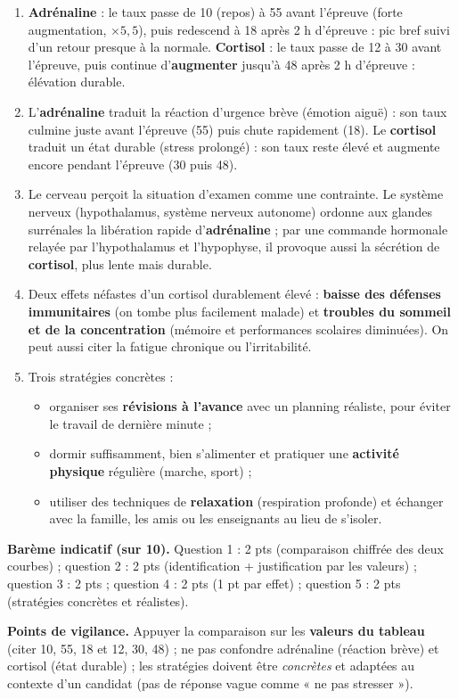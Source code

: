 \documentclass[11pt]{article}
\begin{document}
\begin{corrige}
\begin{enumerate}
\item \textbf{Adrénaline} : le taux passe de 10 (repos) à 55 avant l'épreuve (forte augmentation, $\times 5,5$), puis redescend à 18 après 2 h d'épreuve : pic bref suivi d'un retour presque à la normale. \textbf{Cortisol} : le taux passe de 12 à 30 avant l'épreuve, puis continue d'\textbf{augmenter} jusqu'à 48 après 2 h d'épreuve : élévation durable.
\item L'\textbf{adrénaline} traduit la réaction d'urgence brève (émotion aiguë) : son taux culmine juste avant l'épreuve (55) puis chute rapidement (18). Le \textbf{cortisol} traduit un état durable (stress prolongé) : son taux reste élevé et augmente encore pendant l'épreuve (30 puis 48).
\item Le cerveau perçoit la situation d'examen comme une contrainte. Le système nerveux (hypothalamus, système nerveux autonome) ordonne aux glandes surrénales la libération rapide d'\textbf{adrénaline} ; par une commande hormonale relayée par l'hypothalamus et l'hypophyse, il provoque aussi la sécrétion de \textbf{cortisol}, plus lente mais durable.
\item Deux effets néfastes d'un cortisol durablement élevé : \textbf{baisse des défenses immunitaires} (on tombe plus facilement malade) et \textbf{troubles du sommeil et de la concentration} (mémoire et performances scolaires diminuées). On peut aussi citer la fatigue chronique ou l'irritabilité.
\item Trois stratégies concrètes :
\begin{itemize}
\item organiser ses \textbf{révisions à l'avance} avec un planning réaliste, pour éviter le travail de dernière minute ;
\item dormir suffisamment, bien s'alimenter et pratiquer une \textbf{activité physique} régulière (marche, sport) ;
\item utiliser des techniques de \textbf{relaxation} (respiration profonde) et échanger avec la famille, les amis ou les enseignants au lieu de s'isoler.
\end{itemize}
\end{enumerate}
\textbf{Barème indicatif (sur 10).} Question 1 : 2 pts (comparaison chiffrée des deux courbes) ; question 2 : 2 pts (identification + justification par les valeurs) ; question 3 : 2 pts ; question 4 : 2 pts (1 pt par effet) ; question 5 : 2 pts (stratégies concrètes et réalistes).

\textbf{Points de vigilance.} Appuyer la comparaison sur les \textbf{valeurs du tableau} (citer 10, 55, 18 et 12, 30, 48) ; ne pas confondre adrénaline (réaction brève) et cortisol (état durable) ; les stratégies doivent être \emph{concrètes} et adaptées au contexte d'un candidat (pas de réponse vague comme « ne pas stresser »).
\end{corrige}
\end{document}
